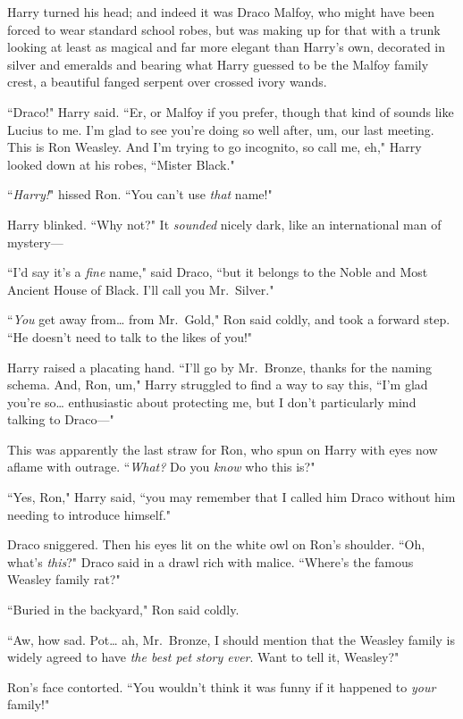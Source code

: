 Harry turned his head; and indeed it was Draco Malfoy, who might have been forced to wear standard school robes, but was making up for that with a trunk looking at least as magical and far more elegant than Harry's own, decorated in silver and emeralds and bearing what Harry guessed to be the Malfoy family crest, a beautiful fanged serpent over crossed ivory wands.

``Draco!" Harry said. ``Er, or Malfoy if you prefer, though that kind of sounds like Lucius to me. I'm glad to see you're doing so well after, um, our last meeting. This is Ron Weasley. And I'm trying to go incognito, so call me, eh," Harry looked down at his robes, ``Mister Black."

``\emph{Harry!}" hissed Ron. ``You can't use \emph{that} name!"

Harry blinked. ``Why not?" It \emph{sounded} nicely dark, like an international man of mystery—

``I'd say it's a \emph{fine} name," said Draco, ``but it belongs to the Noble and Most Ancient House of Black. I'll call you Mr.~Silver."

``\emph{You} get away from{\ldots} from Mr.~Gold," Ron said coldly, and took a forward step. ``He doesn't need to talk to the likes of you!"

Harry raised a placating hand. ``I'll go by Mr.~Bronze, thanks for the naming schema. And, Ron, um," Harry struggled to find a way to say this, ``I'm glad you're so{\ldots} enthusiastic about protecting me, but I don't particularly mind talking to Draco—"

This was apparently the last straw for Ron, who spun on Harry with eyes now aflame with outrage. ``\emph{What?} Do you \emph{know} who this is?"

``Yes, Ron," Harry said, ``you may remember that I called him Draco without him needing to introduce himself."

Draco sniggered. Then his eyes lit on the white owl on Ron's shoulder. ``Oh, what's \emph{this}?" Draco said in a drawl rich with malice. ``Where's the famous Weasley family rat?"

``Buried in the backyard," Ron said coldly.

``Aw, how sad. Pot{\ldots} ah, Mr.~Bronze, I should mention that the Weasley family is widely agreed to have \emph{the best pet story ever}. Want to tell it, Weasley?"

Ron's face contorted. ``You wouldn't think it was funny if it happened to \emph{your} family!"


